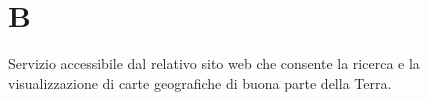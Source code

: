 \section{B}

Servizio accessibile dal relativo sito web che consente la ricerca e la visualizzazione di carte geografiche di buona parte della Terra.
%
